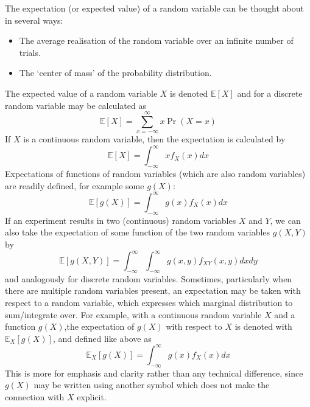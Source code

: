 \documentclass[11pt]{report} %
\begin{document}
The expectation (or expected value) of a random variable can be thought about in several ways:
\begin{itemize}
\item The average realisation of the random variable over an infinite number of trials.
\item The `center of mass' of the probability distribution.
\end{itemize}
The expected value of a random variable $X$ is denoted $\mathbb{E}\left[X\right]$ and for a discrete random variable may be calculated as
\begin{equation}
\mathbb{E}\left[X\right] = \sum_{x = -\infty}^{\infty}x\operatorname{Pr}\left(X = x\right)
\end{equation}
If $X$ is a continuous random variable, then the expectation is calculated by
\begin{equation}
\mathbb{E}\left[X\right] = \int_{-\infty}^{\infty}xf_{X}\left(x\right)dx
\end{equation}
Expectations of functions of random variables (which are also random variables) are readily defined, for example some $g\left(X\right)$:
\begin{equation}
\mathbb{E}\left[g\left(X\right)\right] = \int_{-\infty}^{\infty}g\left(x\right)f_{X}\left(x\right)dx
\end{equation}
If an experiment results in two (continuous) random variables $X$ and $Y$, we can also take the expectation of some function of the two random variables $g\left(X, Y\right)$ by
\begin{equation}
\mathbb{E}\left[g\left(X, Y\right)\right] = \int_{-\infty}^{\infty}\int_{-\infty}^{\infty}g\left(x, y\right)f_{XY}\left(x, y\right)dxdy
\end{equation}
and analogously for discrete random variables. Sometimes, particularly when there are multiple random variables present, an expectation may be taken with respect to a random variable, which expresses which marginal distribution to sum/integrate over. For example, with a continuous random variable $X$ and a function $g\left(X\right)$,the expectation of $g\left(X\right)$ with respect to $X$ is denoted with $\mathbb{E}_{X}\left[g\left(X\right)\right]$, and defined like above as
\begin{equation}
\mathbb{E}_{X}\left[g\left(X\right)\right] = \int_{-\infty}^{\infty}g\left(x\right)f_{X}\left(x\right)dx
\end{equation}
This is more for emphasis and clarity rather than any technical difference, since $g\left(X\right)$ may be written using another symbol which does not make the connection with $X$ explicit.
\end{document}
